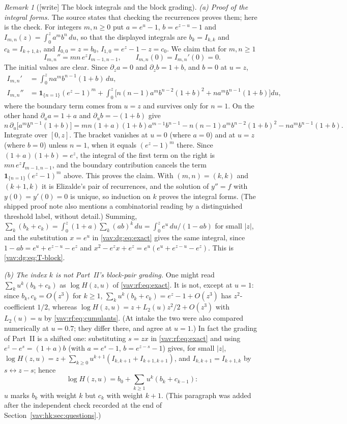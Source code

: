 \documentclass[11pt]{article}
\theoremstyle{remark}\newtheorem{remark}[theorem]{Remark}
\begin{document}
\begin{remark}[{[write]} The block integrals and the block grading]\label{vav:dg:rem:elizalde}
\emph{(a) Proof of the integral forms.} The source states that checking
the recurrences proves them; here is the check. For integers $m,n\ge0$
put $a=e^u-1$, $b=e^{z-u}-1$ and $I_{m,n}(z)=\int_0^z a^mb^n\,du$, so that
the displayed integrals are $b_k=I_{k,k}$ and $c_k=I_{k+1,k}$, and
$I_{0,0}=z=b_0$, $I_{1,0}=e^z-1-z=c_0$. We claim that for $m,n\ge1$
\[
 I_{m,n}''=mn\,e^zI_{m-1,n-1},\qquad I_{m,n}(0)=I_{m,n}'(0)=0 .
\]
The initial values are clear. Since $\partial_za=0$ and
$\partial_zb=1+b$, and $b=0$ at $u=z$,
\begin{align*}
 I_{m,n}'&=\int_0^z n a^mb^{n-1}(1+b)\,du,\\
 I_{m,n}''&=\mathbf 1_{\{n=1\}}(e^z-1)^m
 +\int_0^z\bigl[n(n-1)a^mb^{n-2}(1+b)^2+na^mb^{n-1}(1+b)\bigr]du,
\end{align*}
where the boundary term comes from $u=z$ and survives only for $n=1$. On
the other hand $\partial_ua=1+a$ and $\partial_ub=-(1+b)$ give
\[
 n\,\partial_u\bigl[a^mb^{n-1}(1+b)\bigr]
 =mn(1+a)(1+b)a^{m-1}b^{n-1}
 -n(n-1)a^mb^{n-2}(1+b)^2-na^mb^{n-1}(1+b).
\]
Integrate over $[0,z]$. The bracket vanishes at $u=0$ (where $a=0$) and at
$u=z$ (where $b=0$) unless $n=1$, when it equals $(e^z-1)^m$ there. Since
$(1+a)(1+b)=e^z$, the integral of the first term on the right is
$mn\,e^zI_{m-1,n-1}$, and the boundary contribution cancels the term
$\mathbf 1_{\{n=1\}}(e^z-1)^m$ above. This proves the claim. With
$(m,n)=(k,k)$ and $(k+1,k)$ it is Elizalde's pair of recurrences, and the
solution of $y''=f$ with $y(0)=y'(0)=0$ is unique, so induction on $k$
proves the integral forms. (The shipped proof note
 also mentions a combinatorial reading
by a distinguished threshold label, without detail.) Summing,
$\sum_k(b_k+c_k)=\int_0^z(1+a)\sum_k(ab)^k\,du=\int_0^ze^u\,du/(1-ab)$ for
small $|z|$, and the substitution $x=e^u$ in \eqref{vav:dg:eq:exact} gives
the same integral, since $1-ab=e^u+e^{z-u}-e^z$ and
$x^2-e^zx+e^z=e^u(e^u+e^{z-u}-e^z)$. This is \eqref{vav:dg:eq:T-block}.

\emph{(b) The index $k$ is not Part~II's block-pair grading.} One might
read $\sum_ku^k(b_k+c_k)$ as $\log H(z,u)$ of \eqref{vav:rf:eq:exact}.
It is not, except at $u=1$: since $b_k,c_k=O(z^3)$ for $k\ge1$,
$\sum_ku^k(b_k+c_k)=e^z-1+O(z^3)$ has $z^2$-coefficient $1/2$, whereas
$\log H(z,u)=z+L_2(u)z^2/2+O(z^3)$ with $L_2(u)=u$ by
\eqref{vav:rf:eq:cumulants}. (At intake the two were also compared
numerically at $u=0.7$; they differ there, and agree at $u=1$.)
In fact the grading of Part~II is a shifted one: substituting $s=zx$ in
\eqref{vav:rf:eq:exact} and using $e^z-e^s=(1+a)b$ (with $a=e^s-1$,
$b=e^{z-s}-1$) gives, for small $|z|$,
$\log H(z,u)=z+\sum_{k\ge0}u^{k+1}(I_{k,k+1}+I_{k+1,k+1})$, and
$I_{k,k+1}=I_{k+1,k}$ by $s\leftrightarrow z-s$; hence
\[
 \log H(z,u)=b_0+\sum_{k\ge1}u^k(b_k+c_{k-1}):
\]
$u$ marks $b_k$ with weight $k$ but $c_k$ with weight $k+1$. (This
paragraph was added after the independent check recorded at the end of
Section~\ref{vav:hk:sec:questions}.)
\end{remark}
\end{document}
